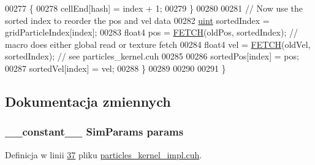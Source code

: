 \begin{DoxyCode}
00277         \{
00278             cellEnd[hash] = index + 1;
00279         \}
00280 
00281         \textcolor{comment}{// Now use the sorted index to reorder the pos and vel data}
00282         \hyperlink{particles__kernel_8cuh_a91ad9478d81a7aaf2593e8d9c3d06a14}{uint} sortedIndex = gridParticleIndex[index];
00283         float4 pos = \hyperlink{particles__kernel_8cuh_a12269d678a65f18889c2a7e98c756457}{FETCH}(oldPos, sortedIndex);       \textcolor{comment}{// macro does either global read or texture
       fetch}
00284         float4 vel = \hyperlink{particles__kernel_8cuh_a12269d678a65f18889c2a7e98c756457}{FETCH}(oldVel, sortedIndex);       \textcolor{comment}{// see particles\_kernel.cuh}
00285 
00286         sortedPos[index] = pos;
00287         sortedVel[index] = vel;
00288     \}
00289 
00290 
00291 \}
\end{DoxyCode}


\subsection{Dokumentacja zmiennych}
\hypertarget{particles__kernel__impl_8cuh_a8db8938e28edd17862daf58651051bdc}{
\subsubsection[{params}]{\setlength{\rightskip}{0pt plus 5cm}\-\_\-\-\_\-constant\-\_\-\-\_\- {\bf Sim\-Params} params}}\label{particles__kernel__impl_8cuh_a8db8938e28edd17862daf58651051bdc}


Definicja w linii \hyperlink{particles__kernel__impl_8cuh_source_l00037}{37} pliku \hyperlink{particles__kernel__impl_8cuh_source}{particles\-\_\-kernel\-\_\-impl.\-cuh}.

